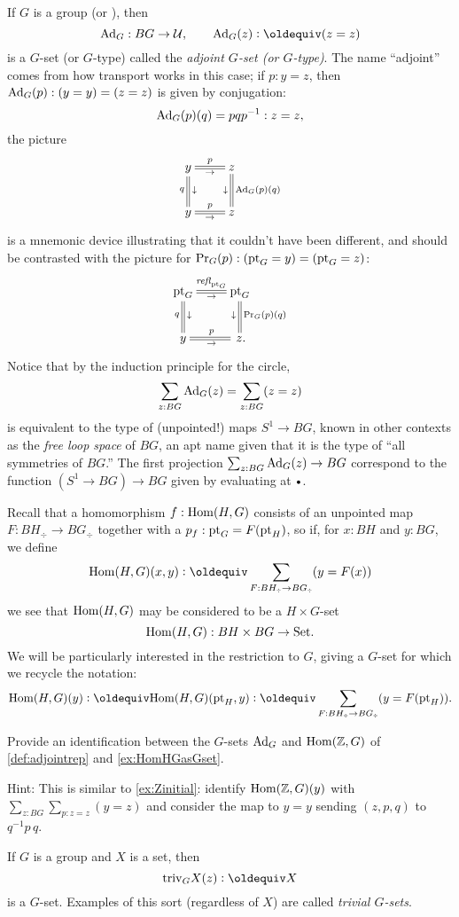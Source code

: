 \begin{example}\label{def:adjointrep}
  If $G$ is a group (or \inftygp), then
$$\Ad_G:BG\to\UU,\qquad\Ad_G(z)\defequi(z=z)$$ is a $G$-set (or $G$-type) called the \emph{adjoint $G$-set (or $G$-type)}.  The name ``adjoint'' comes from how transport works in this case; if $p:y=z$, then $\mathrm{Ad}_G(p):(y=y)=(z=z)$ is given by conjugation: 
$$\mathrm{Ad}_G(p)(q)=pqp^{-1}:z=z,$$ the picture
$$\xymatrix{y\ar@{=}[r]^p_\to\ar@{=}[d]_q^\downarrow&z\ar@{=}[d]^{\Ad_G(p)(q)}_\downarrow\\
y\ar@{=}[r]^p_\to&z}$$
is a mnemonic device illustrating that it couldn't have been different, and should be contrasted with the picture for $\mathrm{Pr}_{{G}} (p):(\mathrm{pt}_G=y)=(\mathrm{pt}_G=z)$:
$$\xymatrix{\pt_G\ar@{=}[r]^{\refl{\pt_G}}_\to\ar@{=}[d]_q^\downarrow&\pt_G\ar@{=}[d]^{\princ G(p)(q)}_\downarrow\\
y\ar@{=}[r]^p_\to&\,z.}$$  
Notice that by the induction principle for the circle,
$$\sum_{z:BG}\mathrm{Ad}_G(z)=\sum_{z:BG}(z=z)$$
is equivalent to the type of (unpointed!) maps $S^1\to BG$, known in other contexts as the \emph{free loop space} of $BG$, an apt name given that it is the type of ``all symmetries of $BG$.''  
The first projection $\sum_{z:BG}\mathrm{Ad}_G(z)\to BG$ correspond to the function $(S^1\to BG)\to BG$ given by evaluating at $\base$. 
\end{example}
\begin{example}
  \label{ex:HomHGasGset}
  Recall that a homomorphism $f:\mathrm{Hom}(H,G)$ consists of an unpointed map $F:BH_\div\to BG_\div$ together with a $p_f:\mathrm{pt}_G=F(\mathrm{pt}_H)$, so if, for $x:BH$ and $y:BG$, we define
$$\Hom(H,G)(x,y)\defequi\sum_{F:BH_\div\to BG_\div}(y=F(x))$$
we see that $\mathrm{Hom}(H,G)$ may be considered to be a $H\times G$-set
$$\mathrm{Hom}(H,G) : BH\times BG\to\mathord{\mathrm{Set}}.$$
We will be particularly interested in the restriction to $G$, giving a $G$-set for which we recycle the notation: 
$$\Hom(H,G)(y)\defequi\Hom(H,G)(\pt_H,y)\defequi \sum_{F:BH_\div\to BG_\div}(y=F(\pt_H)).$$ 
\end{example}
\begin{xca}
  \label{xca:HomZGvsAdG}
  Provide an identification between the $G$-sets 
$\mathrm{Ad}_G$  and $\mathrm{Hom}(\mathbb{Z},G)$ 
of \cref{def:adjointrep} and \cref{ex:HomHGasGset}.

Hint: This is similar to \cref{ex:Zinitial}: 
identify $\mathrm{Hom}(\mathbb{Z},G)(y)$ with $\sum_{z:BG}\sum_{p:z=z}(y=z)$ and 
consider the map to $y=y$ sending $(z,p,q)$ to $q^{-1}p\,q$.
\end{xca}


\begin{example}\label{def:trivGset}
  If $G$ is a group and $X$ is a set, then
$$\mathrm{triv}_GX(z)\defequi X$$ is a $G$-set.  
Examples of this sort (regardless of $X$) are called \emph{trivial $G$-sets}.
\end{example}

